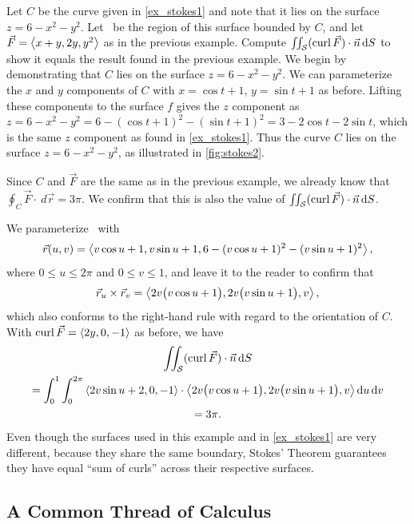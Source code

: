 \begin{example}\label{ex_stokes2}%
Let $C$ be the curve given in \autoref{ex_stokes1} and note that it lies on the surface $z = 6-x^2-y^2$. Let \surfaceS\ be the region of this surface bounded by $C$, and let $\vec F =\left\langle x+y,2y,y^2\right\rangle$ as in the previous example. Compute $\iint_{\mathcal{S}} (\operatorname{curl}\vec F)\cdot \vec n\operatorname{d}\! S $ to show it equals the result found in the previous example.
\solution
We begin by demonstrating that $C$ lies on the surface $z=6-x^2-y^2$. We can parameterize the $x$ and $y$ components of $C$ with $x=\cos t+1$, $y=\sin t+1$ as before. Lifting these components to the surface $f$ gives the $z$ component as $z = 6-x^2-y^2 = 6-(\cos t+1)^2-(\sin t+1)^2 = 3-2\cos t-2\sin t$, which is the same $z$ component as found in \autoref{ex_stokes1}. Thus the curve $C$ lies on the surface $z=6-x^2-y^2$, as illustrated in \autoref{fig:stokes2}. 

Since $C$ and $\vec F$ are the same as in the previous example, we already know that $\oint_C\vec F\cdot\ d\vec r = 3\pi$. We confirm that this is also the value of $\iint_{\mathcal{S}} (\operatorname{curl}\vec F)\cdot \vec n\operatorname{d}\! S$.

We parameterize \surfaceS\ with
\[\vec r(u,v) =\left\langle v\cos u+1,v\sin u+1, 6-(v\cos u+1)^2-(v\sin u+1)^2\right\rangle,\]
where $0\leq u\leq 2\pi$ and $0\leq v\leq 1$, and leave it to the reader to confirm that
\[
\vec r_u\times \vec r_v =\left\langle 2v\bigl(v\cos u+1\bigr), 2v\bigl(v\sin u+1\bigr),v\right\rangle,
\]
which also conforms to the right-hand rule with regard to the orientation of $C$. With $\operatorname{curl} \vec F =\left\langle 2y,0,-1\right\rangle$ as before, we have
\begin{multline*}
	\iint_{\mathcal{S}} (\operatorname{curl}\vec F)\cdot \vec n\operatorname{d}\! S\\ 
	=\int_0^1\int_0^{2\pi}\left\langle 2v\sin u+2,0,-1\right\rangle\cdot\left\langle 2v\bigl(v\cos u+1\bigr), 2v\bigl(v\sin u+1\bigr),v\right\rangle\operatorname{d}\! u\operatorname{d}\! v\\
	=3\pi.
\end{multline*}
Even though the  surfaces used in this example and in \autoref{ex_stokes1} are very different, because they share the same boundary, Stokes' Theorem guarantees they have equal ``sum of curls'' across their respective surfaces.
\end{example}

\subsection{A Common Thread of Calculus}

